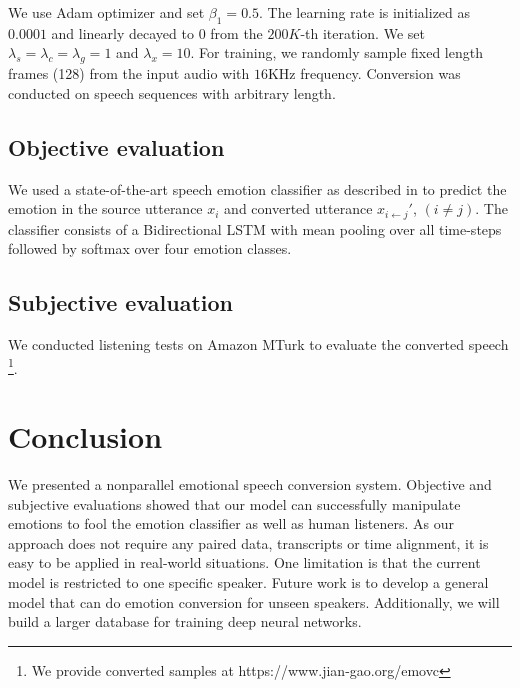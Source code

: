 \documentclass{article}
\begin{document}
We use Adam optimizer and set $\beta_1=0.5$. The learning rate is initialized as $0.0001$ and linearly decayed to $0$ from the $200K$-th iteration. We set $\lambda_s = \lambda_c = \lambda_g = 1$ and $\lambda_x=10$. For training, we randomly sample fixed length frames (128) from the input audio with $16$KHz frequency. Conversion was conducted on speech sequences with arbitrary length.



\subsection{Objective evaluation}
We used a state-of-the-art speech emotion classifier as described in \cite{mirsamadi2017automatic} to predict the emotion in the source utterance $x_i$ and converted utterance $x_{i\leftarrow j}'$, $(i \neq j)$. The classifier consists of a Bidirectional LSTM with mean pooling over all time-steps followed by softmax over four emotion classes. 

\subsection{Subjective evaluation}
We conducted listening tests on Amazon MTurk to evaluate the converted speech \footnote{We provide converted samples at https://www.jian-gao.org/emovc}.


\section{Conclusion}
\label{sec:con}
We presented a nonparallel emotional speech conversion system. Objective and subjective evaluations showed that our model can successfully manipulate emotions to fool the emotion classifier as well as human listeners. As our approach does not require any paired data, transcripts or time alignment, it is easy to be applied in real-world situations. One limitation is that the current model is restricted to one specific speaker. Future work is to develop a general model that can do emotion conversion for unseen speakers. Additionally, we will build a larger database for training deep neural networks.
\end{document}
